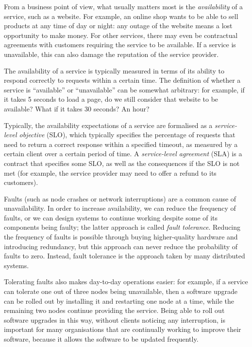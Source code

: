 From a business point of view, what usually matters most is the \emph{availability} of a service, such as a website.
For example, an online shop wants to be able to sell products at any time of day or night: any outage of the website means a lost opportunity to make money.
For other services, there may even be contractual agreements with customers requiring the service to be available.
If a service is unavailable, this can also damage the reputation of the service provider.

The availability of a service is typically measured in terms of its ability to respond correctly to requests within a certain time.
The definition of whether a service is ``available'' or ``unavailable'' can be somewhat arbitrary: for example, if it takes 5 seconds to load a page, do we still consider that website to be available?
What if it takes 30 seconds?
An hour?

Typically, the availability expectations of a service are formalised as a \emph{service-level objective} (SLO), which typically specifies the percentage of requests that need to return a correct response within a specified timeout, as measured by a certain client over a certain period of time.
A \emph{service-level agreement} (SLA) is a contract that specifies some SLO, as well as the consequences if the SLO is not met (for example, the service provider may need to offer a refund to its customers).

Faults (such as node crashes or network interruptions) are a common cause of unavailability.
In order to increase availability, we can reduce the frequency of faults, or we can design systems to continue working despite some of its components being faulty; the latter approach is called \emph{fault tolerance}.
Reducing the frequency of faults is possible through buying higher-quality hardware and introducing redundancy, but this approach can never reduce the probability of faults to zero.
Instead, fault tolerance is the approach taken by many distributed systems.

Tolerating faults also makes day-to-day operations easier: for example, if a service can tolerate one out of three nodes being unavailable, then a software upgrade can be rolled out by installing it and restarting one node at a time, while the remaining two nodes continue providing the service.
Being able to roll out software upgrades in this way, without clients noticing any interruption, is important for many organisations that are continually working to improve their software, because it allows the software to be updated frequently.

